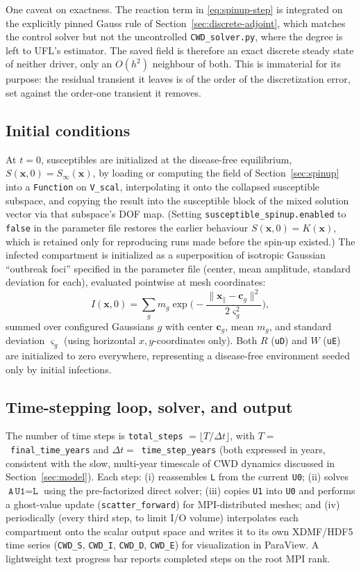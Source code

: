 \documentclass[11pt]{article}
\begin{document}
One caveat on exactness. The reaction term in \eqref{eq:spinup-step} is integrated on the explicitly pinned Gauss rule of Section~\ref{sec:discrete-adjoint}, which matches the control solver but not the uncontrolled \texttt{CWD\_solver.py}, where the degree is left to UFL's estimator. The saved field is therefore an exact discrete steady state of neither driver, only an $O(h^2)$ neighbour of both. This is immaterial for its purpose: the residual transient it leaves is of the order of the discretization error, set against the order-one transient it removes.

\subsection{Initial conditions}

At $t=0$, susceptibles are initialized at the disease-free equilibrium, $S(\mathbf{x},0)=S_\infty(\mathbf{x})$, by loading or computing the field of Section~\ref{sec:spinup} into a \texttt{Function} on \texttt{V\_scal}, interpolating it onto the collapsed susceptible subspace, and copying the result into the susceptible block of the mixed solution vector via that subspace's DOF map. (Setting \texttt{susceptible\_spinup.enabled} to \texttt{false} in the parameter file restores the earlier behaviour $S(\mathbf{x},0)=K(\mathbf{x})$, which is retained only for reproducing runs made before the spin-up existed.) The infected compartment is initialized as a superposition of isotropic Gaussian ``outbreak foci'' specified in the parameter file (center, mean amplitude, standard deviation for each), evaluated pointwise at mesh coordinates:
\[
I(\mathbf{x},0) = \sum_{g} m_g \exp\!\Big(-\frac{\lVert \mathbf{x}_{\parallel}-\mathbf{c}_g\rVert^2}{2\varsigma_g^2}\Big),
\]
summed over configured Gaussians $g$ with center $\mathbf{c}_g$, mean $m_g$, and standard deviation $\varsigma_g$ (using horizontal $x,y$-coordinates only). Both $R$ (\texttt{uD}) and $W$ (\texttt{uE}) are initialized to zero everywhere, representing a disease-free environment seeded only by initial infections.

\subsection{Time-stepping loop, solver, and output}

The number of time steps is \texttt{total\_steps} $= \lfloor T/\Delta t\rfloor$, with $T=$~\texttt{final\_time\_years} and $\Delta t=$~\texttt{time\_step\_years} (both expressed in years, consistent with the slow, multi-year timescale of CWD dynamics discussed in Section~\ref{sec:model}). Each step: (i) reassembles \texttt{L} from the current \texttt{U0}; (ii) solves $\texttt{A}\,\texttt{U1}=\texttt{L}$ using the pre-factorized direct solver; (iii) copies \texttt{U1} into \texttt{U0} and performs a ghost-value update (\texttt{scatter\_forward}) for MPI-distributed meshes; and (iv) periodically (every third step, to limit I/O volume) interpolates each compartment onto the scalar output space and writes it to its own XDMF/HDF5 time series (\texttt{CWD\_S}, \texttt{CWD\_I}, \texttt{CWD\_D}, \texttt{CWD\_E}) for visualization in ParaView. A lightweight text progress bar reports completed steps on the root MPI rank.
\end{document}
